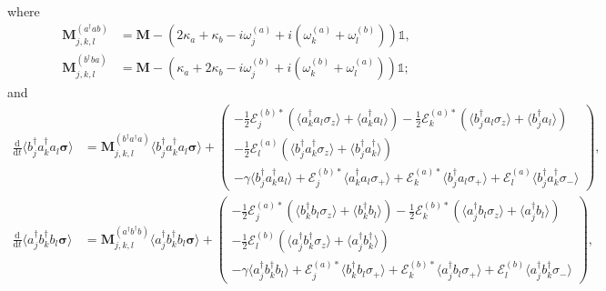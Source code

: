 \documentclass{article}
\newcommand{\ddt}[1][]{\frac{\mathrm{d} #1}{\mathrm{d}t}}
\begin{document}
where
\begin{subequations}
	\begin{align}
		\bm{M}_{j, k, l}^{(a^{\dagger} a b)} &= \bm{M} - \left( 2\kappa_{a} + \kappa_{b} - i \omega_{j}^{(a)} + i \left( \omega_{k}^{(a)} + \omega_{l}^{(b)} \right) \right) \mathbb{1}, \\
		\bm{M}_{j, k, l}^{(b^{\dagger} b a)} &= \bm{M} - \left( \kappa_{a} + 2\kappa_{b} - i \omega_{j}^{(b)} + i \left( \omega_{k}^{(b)} + \omega_{l}^{(a)} \right) \right) \mathbb{1};
	\end{align}
\end{subequations}
and
\begin{subequations}
	\begin{align}
		\ddt \langle b^{\dagger}_{j} a^{\dagger}_{k} a_{l} \bm{\sigma} \rangle &= \bm{M}_{j, k, l}^{(b^{\dagger} a^{\dagger} a)} \langle b^{\dagger}_{j} a^{\dagger}_{k} a_{l} \bm{\sigma} \rangle +
		\begin{pmatrix}
			-\frac{1}{2} \mathcal{E}_{j}^{(b) *} \left( \langle a^{\dagger}_{k} a_{l} \sigma_{z} \rangle + \langle a^{\dagger}_{k} a_{l} \rangle \right) - \frac{1}{2} \mathcal{E}_{k}^{(a) *} \left( \langle b^{\dagger}_{j} a_{l} \sigma_{z} \rangle + \langle b^{\dagger}_{j} a_{l} \rangle \right) \\
			-\frac{1}{2} \mathcal{E}_{l}^{(a)} \left( \langle b^{\dagger}_{j} a^{\dagger}_{k} \sigma_{z} \rangle + \langle b^{\dagger}_{j} a^{\dagger}_{k} \rangle \right) \\
			-\gamma \langle b^{\dagger}_{j} a^{\dagger}_{k} a_{l} \rangle + \mathcal{E}_{j}^{(b) *} \langle a^{\dagger}_{k} a_{l} \sigma_{+} \rangle + \mathcal{E}_{k}^{(a) *} \langle b^{\dagger}_{j} a_{l} \sigma_{+} \rangle + \mathcal{E}_{l}^{(a)} \langle b^{\dagger}_{j} a^{\dagger}_{k} \sigma_{-} \rangle
		\end{pmatrix}, \\
		\ddt \langle a^{\dagger}_{j} b^{\dagger}_{k} b_{l} \bm{\sigma} \rangle &= \bm{M}_{j, k, l}^{(a^{\dagger} b^{\dagger} b)} \langle a^{\dagger}_{j} b^{\dagger}_{k} b_{l} \bm{\sigma} \rangle +
		\begin{pmatrix}
			-\frac{1}{2} \mathcal{E}_{j}^{(a) *} \left( \langle b^{\dagger}_{k} b_{l} \sigma_{z} \rangle + \langle b^{\dagger}_{k} b_{l} \rangle \right) - \frac{1}{2} \mathcal{E}_{k}^{(b) *} \left( \langle a^{\dagger}_{j} b_{l} \sigma_{z} \rangle + \langle a^{\dagger}_{j} b_{l} \rangle \right) \\
			-\frac{1}{2} \mathcal{E}_{l}^{(b)} \left( \langle a^{\dagger}_{j} b^{\dagger}_{k} \sigma_{z} \rangle + \langle a^{\dagger}_{j} b^{\dagger}_{k} \rangle \right) \\
			-\gamma \langle a^{\dagger}_{j} b^{\dagger}_{k} b_{l} \rangle + \mathcal{E}_{j}^{(a) *} \langle b^{\dagger}_{k} b_{l} \sigma_{+} \rangle + \mathcal{E}_{k}^{(b) *} \langle a^{\dagger}_{j} b_{l} \sigma_{+} \rangle + \mathcal{E}_{l}^{(b)} \langle a^{\dagger}_{j} b^{\dagger}_{k} \sigma_{-} \rangle
		\end{pmatrix},
	\end{align}
\end{subequations}
\end{document}
